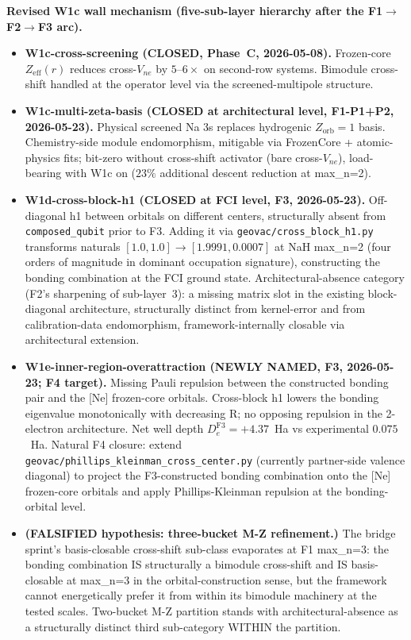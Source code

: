 \documentclass[aps,pra,twocolumn,superscriptaddress,longbibliography]{revtex4-2}
\begin{document}
\textbf{Revised W1c wall mechanism (five-sub-layer hierarchy after the
F1$\to$F2$\to$F3 arc).}
\begin{itemize}\setlength\itemsep{0pt}
\item \textbf{W1c-cross-screening (CLOSED, Phase~C, 2026-05-08).}
  Frozen-core $Z_\text{eff}(r)$ reduces cross-$V_{ne}$ by $5$--$6\times$
  on second-row systems. Bimodule cross-shift handled at the operator
  level via the screened-multipole structure.
\item \textbf{W1c-multi-zeta-basis (CLOSED at architectural level, F1-P1+P2,
  2026-05-23).} Physical screened Na 3s replaces hydrogenic
  $Z_\text{orb}=1$ basis. Chemistry-side module endomorphism, mitigable via
  FrozenCore + atomic-physics fits; bit-zero without cross-shift activator
  (bare cross-$V_{ne}$), load-bearing with W1c on ($23\%$ additional descent
  reduction at max\_n=2).
\item \textbf{W1d-cross-block-h1 (CLOSED at FCI level, F3, 2026-05-23).}
  Off-diagonal h1 between orbitals on different centers, structurally
  absent from \texttt{composed\_qubit} prior to F3. Adding it via
  \texttt{geovac/cross\_block\_h1.py} transforms naturals
  $[1.0, 1.0] \to [1.9991, 0.0007]$ at NaH max\_n=2 (four orders of
  magnitude in dominant occupation signature), constructing the bonding
  combination at the FCI ground state. Architectural-absence category
  (F2's sharpening of sub-layer~3): a missing matrix slot in the existing
  block-diagonal architecture, structurally distinct from kernel-error and
  from calibration-data endomorphism, framework-internally closable via
  architectural extension.
\item \textbf{W1e-inner-region-overattraction (NEWLY NAMED, F3, 2026-05-23;
  F4 target).} Missing Pauli repulsion between the constructed bonding
  pair and the [Ne] frozen-core orbitals. Cross-block h1 lowers the bonding
  eigenvalue monotonically with decreasing R; no opposing repulsion in the
  2-electron architecture. Net well depth $D_e^\text{F3} = +4.37$~Ha vs
  experimental $0.075$~Ha. Natural F4 closure: extend
  \texttt{geovac/phillips\_kleinman\_cross\_center.py} (currently
  partner-side valence diagonal) to project the F3-constructed bonding
  combination onto the [Ne] frozen-core orbitals and apply Phillips-Kleinman
  repulsion at the bonding-orbital level.
\item \textbf{(FALSIFIED hypothesis: three-bucket M-Z refinement.)} The
  bridge sprint's basis-closable cross-shift sub-class evaporates at
  F1 max\_n=3: the bonding combination IS structurally a bimodule
  cross-shift and IS basis-closable at max\_n=3 in the orbital-construction
  sense, but the framework cannot energetically prefer it from within its
  bimodule machinery at the tested scales. Two-bucket M-Z partition stands
  with architectural-absence as a structurally distinct third
  sub-category WITHIN the partition.
\end{itemize}
\end{document}
